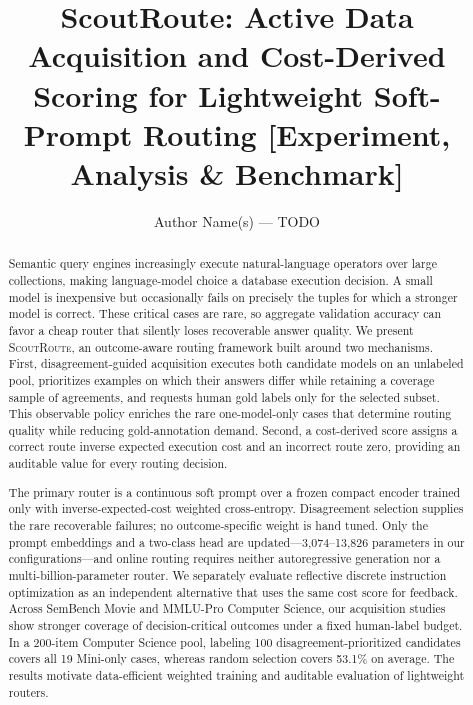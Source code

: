 \documentclass[sigconf, nonacm]{acmart}
\newcommand{\system}{\textsc{ScoutRoute}\xspace}
\begin{document}
\title{ScoutRoute: Active Data Acquisition and Cost-Derived Scoring for Lightweight Soft-Prompt Routing [Experiment, Analysis \& Benchmark]}

\author{Author Name(s) --- TODO}

\begin{abstract}
Semantic query engines increasingly execute natural-language operators over
large collections, making language-model choice a database execution decision.
A small model is inexpensive but occasionally fails on precisely the tuples for
which a stronger model is correct. These critical cases are rare, so aggregate
validation accuracy can favor a cheap router that silently loses recoverable
answer quality. We present \system, an outcome-aware routing framework built
around two mechanisms. First, disagreement-guided acquisition executes both
candidate models on an unlabeled pool, prioritizes examples on which their
answers differ while retaining a coverage sample of agreements, and requests
human gold labels only for the selected subset. This observable policy enriches
the rare one-model-only cases that determine routing quality while reducing
gold-annotation demand. Second, a cost-derived score assigns
a correct route inverse expected execution cost and an incorrect route zero,
providing an auditable value for every routing decision.

The primary router is a continuous soft prompt over a frozen compact encoder
trained only with inverse-expected-cost weighted cross-entropy. Disagreement
selection supplies the rare recoverable failures; no outcome-specific weight is
hand tuned. Only
the prompt embeddings and a two-class head are updated---3,074--13,826
parameters in our configurations---and online routing requires neither
autoregressive generation nor a multi-billion-parameter router. We separately
evaluate reflective discrete instruction optimization as an independent
alternative that uses the same cost score for feedback. Across SemBench Movie
and MMLU-Pro Computer Science, our acquisition studies show stronger coverage
of decision-critical outcomes under a fixed human-label budget. In a 200-item
Computer Science pool, labeling 100 disagreement-prioritized candidates covers
all 19 Mini-only cases, whereas random selection covers 53.1\% on average.
The results motivate data-efficient weighted training and auditable evaluation
of lightweight routers.
\end{abstract}
\maketitle

\vldbtopmatter











\end{document}
